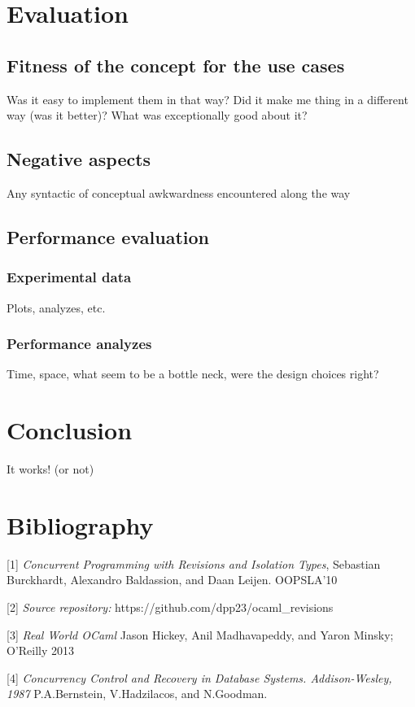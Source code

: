 \documentclass[12pt,twoside,notitlepage]{report}
\begin{document}
\cleardoublepage
\chapter{Evaluation}

\section{Fitness of the concept for the use cases}
Was it easy to implement them in that way? Did it make me thing in a different way (was it better)? What was exceptionally good about it?

\section{Negative aspects}
Any syntactic of conceptual awkwardness encountered along the way

\section{Performance evaluation}
\subsection{Experimental data}
Plots, analyzes, etc.

\subsection{Performance analyzes}
Time, space, what seem to be a bottle neck, were the design choices right? 




\cleardoublepage
\chapter{Conclusion}

It works! (or not)




\cleardoublepage



\cleardoublepage
\chapter{Bibliography}
\begin{description}
\item{[1]} \emph{Concurrent Programming with Revisions and Isolation Types}, Sebastian Burckhardt, Alexandro Baldassion, and Daan Leijen. OOPSLA'10
\item{[2]} \emph{Source repository:} https://github.com/dpp23/ocaml\_revisions
\item{[3]} \emph{Real World OCaml} Jason Hickey, Anil Madhavapeddy, and Yaron Minsky; O'Reilly 2013
\item{[4]} \emph{Concurrency Control and Recovery in Database Systems. Addison-Wesley, 1987} P.A.Bernstein, V.Hadzilacos, and N.Goodman.

\end{description}
\end{document}
